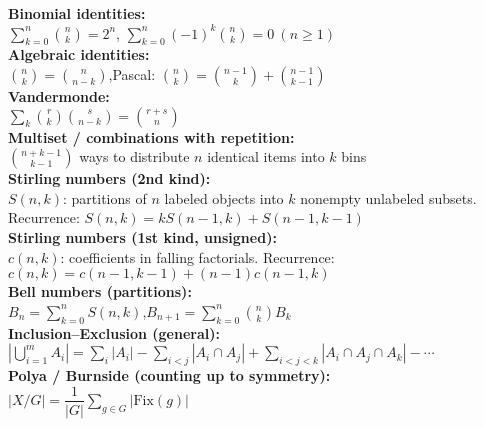 \textbf{Binomial identities:} \\[1mm]
$\displaystyle \sum_{k=0}^n \binom{n}{k} = 2^n$,\quad
$\displaystyle \sum_{k=0}^n (-1)^k\binom{n}{k}=0\ (n\ge1)$ \\

\textbf{Algebraic identities:} \\[1mm]
$\displaystyle \binom{n}{k} = \binom{n}{n-k}$,\quad Pascal: $\binom{n}{k}=\binom{n-1}{k}+\binom{n-1}{k-1}$ \\

\textbf{Vandermonde:} \\[1mm]
$\displaystyle \sum_{k} \binom{r}{k}\binom{s}{n-k}=\binom{r+s}{n}$ \\

\textbf{Multiset / combinations with repetition:} \\[1mm]
$\displaystyle \binom{n+k-1}{k-1}$ ways to distribute $n$ identical items into $k$ bins \\

\textbf{Stirling numbers (2nd kind):} \\[1mm]
$S(n,k)$: partitions of $n$ labeled objects into $k$ nonempty unlabeled subsets. \\
Recurrence: $S(n,k)=kS(n-1,k)+S(n-1,k-1)$ \\

\textbf{Stirling numbers (1st kind, unsigned):} \\[1mm]
$c(n,k)$: coefficients in falling factorials. Recurrence: $c(n,k) = c(n-1,k-1) + (n-1)c(n-1,k)$ \\

\textbf{Bell numbers (partitions):} \\[1mm]
$B_{n}=\sum_{k=0}^n S(n,k)$,\quad $B_{n+1}=\sum_{k=0}^n \binom{n}{k} B_k$ \\

\textbf{Inclusion--Exclusion (general):} \\[1mm]
$\displaystyle \left|\bigcup_{i=1}^m A_i\right|
=\sum_{i} |A_i| - \sum_{i<j}|A_i\cap A_j| + \sum_{i<j<k} |A_i\cap A_j\cap A_k| - \cdots$ \\

\textbf{Polya / Burnside (counting up to symmetry):} \\[1mm]
$|X/G|=\dfrac{1}{|G|}\sum_{g\in G} |\mathrm{Fix}(g)|$ \\